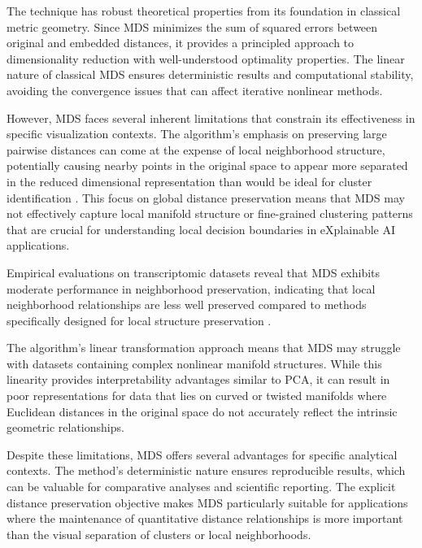 The technique has robust theoretical properties from its foundation in classical metric geometry. Since MDS minimizes the sum of squared errors between original and embedded distances, it provides a principled approach to dimensionality reduction with well-understood optimality properties. The linear nature of classical MDS ensures deterministic results and computational stability, avoiding the convergence issues that can affect iterative nonlinear methods.

However, MDS faces several inherent limitations that constrain its effectiveness in specific visualization contexts. The algorithm's emphasis on preserving large pairwise distances can come at the expense of local neighborhood structure, potentially causing nearby points in the original space to appear more separated in the reduced dimensional representation than would be ideal for cluster identification \cite{maaten2008tsne}. This focus on global distance preservation means that MDS may not effectively capture local manifold structure or fine-grained clustering patterns that are crucial for understanding local decision boundaries in eXplainable AI applications.

Empirical evaluations on transcriptomic datasets reveal that MDS exhibits moderate performance in neighborhood preservation, 
indicating that local neighborhood relationships are less well preserved compared to methods specifically designed for local structure preservation \cite{yang2021dimensionality}. 

The algorithm's linear transformation approach means that MDS may struggle with datasets containing complex nonlinear manifold structures. While this linearity provides interpretability advantages similar to PCA, it can result in poor representations for data that lies on curved or twisted manifolds where Euclidean distances in the original space do not accurately reflect the intrinsic geometric relationships.

Despite these limitations, MDS offers several advantages for specific analytical contexts. The method's deterministic nature ensures reproducible results, which can be valuable for comparative analyses and scientific reporting. The explicit distance preservation objective makes MDS particularly suitable for applications where the maintenance of quantitative distance relationships is more important than the visual separation of clusters or local neighborhoods.

